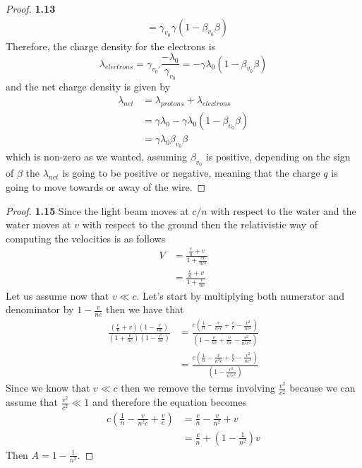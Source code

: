 \documentclass[11pt]{article}
\theoremstyle{definition}
\begin{document}
\begin{proof}{\textbf{1.13}}
\begin{align*}
                &= \gamma_{v_0}\gamma(1-\beta_{v_0}\beta)
        \end{align*}
        Therefore, the charge density for the electrons is
        $$\lambda_{electrons} = \gamma_{v_0'}\frac{-\lambda_0}{\gamma_{v_0}} =
        -\gamma\lambda_0(1-\beta_{v_0}\beta)$$
        and the net charge density is given by
        \begin{align*}
            \lambda_{net} &= \lambda_{protons} + \lambda_{electrons}\\
                &= \gamma\lambda_0 - \gamma\lambda_0(1-\beta_{v_0}\beta)\\
                &= \gamma\lambda_0\beta_{v_0}\beta
        \end{align*}
        which is non-zero as we wanted, assuming $\beta_{v_0}$ is positive,
        depending on the sign of $\beta$ the $\lambda_{net}$ is going to be
        positive or negative, meaning that the charge $q$ is going to move
        towards or away of the wire.
    \end{proof}
    \begin{proof}{\textbf{1.15}}
        Since the light beam moves at $c/n$ with respect to the water and the water
        moves at $v$ with respect to the ground then the relativistic way of computing
        the velocities is as follows
        \begin{align*}
            V &= \frac{\frac{c}{n} + v}{1 + \frac{cv}{nc^2}}\\
              &= \frac{\frac{c}{n} + v}{1 + \frac{v}{nc}}
        \end{align*}
        Let us assume now that $v \ll c$. Let's start by multiplying both numerator
        and denominator by $1-\frac{v}{nc}$ then we have that
        \begin{align*}
            \frac{
                (\frac{c}{n} + v)(1-\frac{v}{nc})
                }{
                (1 + \frac{v}{nc})(1-\frac{v}{nc})
            } &= \frac{
                c(\frac{1}{n} - \frac{v}{n^2c} + \frac{v}{c} - \frac{v^2}{nc^2})
                }{
                (1 -\frac{v}{nc} + \frac{v}{nc} -\frac{v^2}{n^2c^2})
            }
            \\
            &= \frac{
                c(\frac{1}{n} - \frac{v}{n^2c} + \frac{v}{c} - \frac{v^2}{nc^2})
                }{
                (1 -\frac{v^2}{n^2c^2})
            }
        \end{align*}
        Since we know that $v \ll c$ then we remove the terms involving 
        $\frac{v^2}{c^2}$ because we can assume that $\frac{v^2}{c^2} \ll 1$
        and therefore the equation becomes
        \begin{align*}
            c(\frac{1}{n} - \frac{v}{n^2c} + \frac{v}{c}) &= \frac{c}{n} - \frac{v}{n^2} + v\\
                &= \frac{c}{n} + (1-\frac{1}{n^2})v
        \end{align*}
        Then $A = 1-\frac{1}{n^2}$.
    \end{proof}
\end{document}
